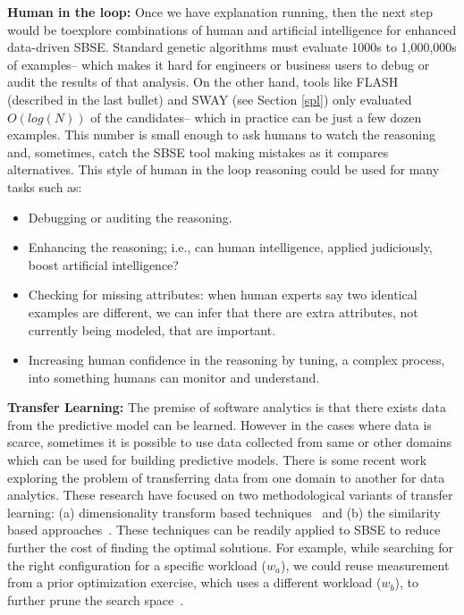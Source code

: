 \documentclass[sigconf]{acmart}
\begin{document}
 \noindent\textbf{Human in the loop: } Once we have explanation running, then the next step would be toexplore combinations of human and artificial intelligence for
enhanced data-driven SBSE.
Standard genetic algorithms must evaluate 1000s to 1,000,000s of examples-- which makes it hard for engineers or business users to debug or audit the results of that analysis. On the 
other hand, tools like FLASH (described in the last bullet)
and SWAY (see Section \ref{spl}) only evaluated $O(log(N))$ of the candidates-- which in practice can be just a few dozen examples. This number is small enough to ask humans
to watch the reasoning and, sometimes, catch the SBSE
tool making mistakes as it compares alternatives.  This style of human in the loop reasoning could be used for many tasks such as:
\begin{itemize}[leftmargin=*]
\item Debugging or auditing the reasoning.
\item Enhancing the reasoning; i.e., can human intelligence, applied judiciously,  boost artificial intelligence?
\item Checking for missing attributes: when human experts say two identical examples are different, we can infer that there are extra attributes, not currently being modeled, that are important.
\item Increasing human confidence in the reasoning by tuning, a  complex process, into something
humans can monitor and understand.
\end{itemize}


 \noindent\textbf{Transfer Learning: } The premise of software analytics is that there exists data
from the predictive model can be learned. However in the cases where data is scarce, sometimes it is possible to use data collected from same or other domains
which can be used for building predictive models. There is some recent work exploring the problem of transferring data from one domain to another for data analytics. These research have focused on two methodological variants of transfer learning: (a) dimensionality
transform based techniques~\cite{nam2013transfer, krishna2016too, nam2017heterogeneous,minku2014transfer}
and (b) the similarity based approaches~\cite{kocaguneli2011find, kocaguneli2015transfer, peters2015lace2}.
These techniques can be readily applied to SBSE to reduce further the cost of finding the optimal solutions. For example, while searching for the right configuration for a specific workload ($w_a$), we could reuse measurement from a prior optimization exercise, which uses a different workload ($w_b$), to further prune the search space~\cite{jamshidi2017transfer, jamshidi2017transfer, valov2017transferring}.
\end{document}
